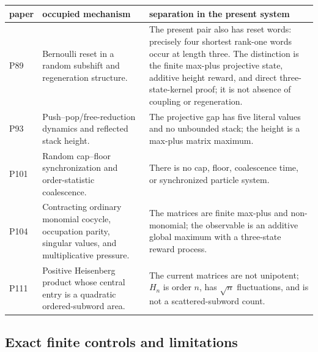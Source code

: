 \begin{center}
\small
\renewcommand{\arraystretch}{1.14}
\begin{tabular}{>{\raggedright\arraybackslash}p{}
                >{\raggedright\arraybackslash}p{}
                >{\raggedright\arraybackslash}p{}}
\toprule
paper & occupied mechanism & separation in the present system\\
\midrule
P89 & Bernoulli reset in a random subshift and regeneration structure.
& The present pair also has reset words: precisely four shortest rank-one
  words occur at length three.  The distinction is the finite max-plus
  projective state, additive height reward, and direct three-state-kernel
  proof; it is not absence of coupling or regeneration.\\
P93 & Push--pop/free-reduction dynamics and reflected stack height.
& The projective gap has five literal values and no unbounded stack; the
  height is a max-plus matrix maximum.\\
P101 & Random cap--floor synchronization and order-statistic coalescence.
& There is no cap, floor, coalescence time, or synchronized particle system.\\
P104 & Contracting ordinary monomial cocycle, occupation parity, singular
       values, and multiplicative pressure.
& The matrices are finite max-plus and non-monomial; the observable is an
  additive global maximum with a three-state reward process.\\
P111 & Positive Heisenberg product whose central entry is a quadratic
       ordered-subword area.
& The current matrices are not unipotent; $H_n$ is order $n$, has
  $\sqrt n$ fluctuations, and is not a scattered-subword count.\\
\bottomrule
\end{tabular}
\end{center}

\subsection{Exact finite controls and limitations}

